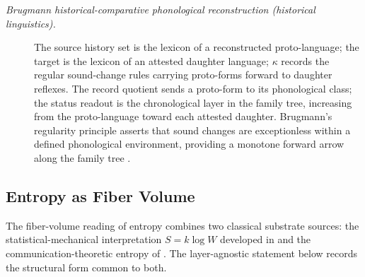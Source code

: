 \documentclass[11pt]{article}
\theoremstyle{definition}
\begin{document}
\begin{description}
\item[\emph{Brugmann historical-comparative
phonological reconstruction (historical linguistics).}]
The source history set is the lexicon of a
reconstructed proto-language; the target is the
lexicon of an attested daughter language; \(\kappa\)
records the regular sound-change rules carrying
proto-forms forward to daughter reflexes.  The record
quotient sends a proto-form to its phonological class;
the status readout is the chronological layer in the
family tree, increasing from the proto-language toward
each attested daughter.  Brugmann's regularity
principle asserts that sound changes are exceptionless
within a defined phonological environment, providing a
monotone forward arrow along the family tree
\citep{Brugmann1886Grundriss}.
\end{description}

\subsection{Entropy as Fiber Volume}\label{sec:self-reference-limits:entropy}

The fiber-volume reading of entropy combines two classical substrate
sources: the statistical-mechanical interpretation
\(S=k\log W\) developed in \citet{Boltzmann1877Beziehung} and the
communication-theoretic entropy of \citet{Shannon1948Mathematical}.
The layer-agnostic statement below records the structural form
common to both.
\end{document}
